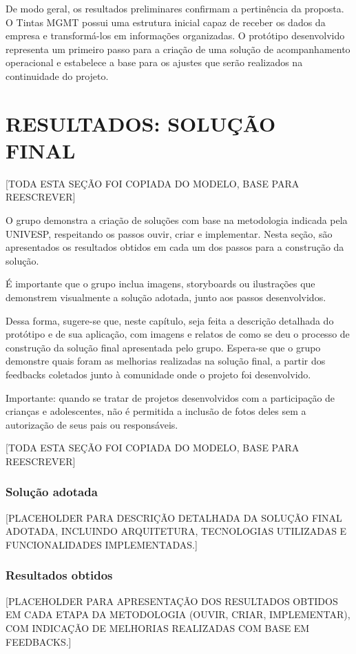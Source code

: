 \documentclass[12pt,a4paper]{article}
\begin{document}
De modo geral, os resultados preliminares confirmam a pertinência da proposta. O Tintas MGMT possui uma estrutura inicial capaz de receber os dados da empresa e transformá-los em informações organizadas. O protótipo desenvolvido representa um primeiro passo para a criação de uma solução de acompanhamento operacional e estabelece a base para os ajustes que serão realizados na continuidade do projeto.

\newpage
\section{RESULTADOS: SOLUÇÃO FINAL}

[TODA ESTA SEÇÃO FOI COPIADA DO MODELO, BASE PARA REESCREVER]

O grupo demonstra a criação de soluções com base na metodologia indicada pela UNIVESP, respeitando os passos ouvir, criar e implementar. Nesta seção, são apresentados os resultados obtidos em cada um dos passos para a construção da solução.

É importante que o grupo inclua imagens, storyboards ou ilustrações que demonstrem visualmente a solução adotada, junto aos passos desenvolvidos.

Dessa forma, sugere-se que, neste capítulo, seja feita a descrição detalhada do protótipo e de sua aplicação, com imagens e relatos de como se deu o processo de construção da solução final apresentada pelo grupo. Espera-se que o grupo demonstre quais foram as melhorias realizadas na solução final, a partir dos feedbacks coletados junto à comunidade onde o projeto foi desenvolvido.

Importante: quando se tratar de projetos desenvolvidos com a participação de crianças e adolescentes, não é permitida a inclusão de fotos deles sem a autorização de seus pais ou responsáveis.

[TODA ESTA SEÇÃO FOI COPIADA DO MODELO, BASE PARA REESCREVER]

\subsubsection{Solução adotada}
[PLACEHOLDER PARA DESCRIÇÃO DETALHADA DA SOLUÇÃO FINAL ADOTADA, INCLUINDO ARQUITETURA, TECNOLOGIAS UTILIZADAS E FUNCIONALIDADES IMPLEMENTADAS.]

\subsubsection{Resultados obtidos}
[PLACEHOLDER PARA APRESENTAÇÃO DOS RESULTADOS OBTIDOS EM CADA ETAPA DA METODOLOGIA (OUVIR, CRIAR, IMPLEMENTAR), COM INDICAÇÃO DE MELHORIAS REALIZADAS COM BASE EM FEEDBACKS.]
\end{document}
